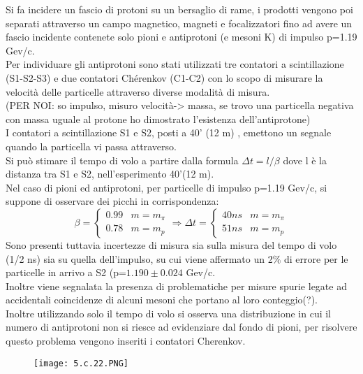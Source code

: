 \documentclass[twoside]{article}
\begin{document}
Si fa incidere un fascio di protoni su un bersaglio di rame, i prodotti vengono poi separati attraverso un campo magnetico, magneti e focalizzatori fino ad avere un fascio incidente contenete solo pioni e antiprotoni (e mesoni K) di impulso p=1.19 Gev/c.\\
Per individuare gli antiprotoni sono stati utilizzati tre contatori a scintillazione (S1-S2-S3) e due contatori Chérenkov (C1-C2) con lo scopo di misurare la velocità delle particelle attraverso diverse modalità di misura.\\
(PER NOI: so impulso, misuro velocità-> massa, se trovo una particella negativa con massa uguale al protone ho dimostrato l'esistenza dell'antiprotone)\\
I contatori a scintillazione S1 e S2, posti a 40' (12 m) , emettono un segnale quando la particella vi passa attraverso.\\
Si può stimare il tempo di volo a partire dalla formula $\Delta t= l/\beta$ dove l è la distanza tra S1 e S2, nell'esperimento 40'(12 m).\\
Nel caso di pioni ed antiprotoni, per particelle di impulso p=1.19 Gev/c, si suppone di osservare dei picchi in corrispondenza:\\
\begin{equation}
    \beta=\begin{cases}
    0.99 &  m=m_{\pi} \\
    0.78 &  m=m_{p}
    \end{cases}\Longrightarrow
    \Delta t=  \begin{cases}
    40 ns &  m=m_{\pi} \\
    51 ns &  m=m_{p}
    \end{cases}
\end{equation}
Sono presenti tuttavia incertezze di misura sia sulla misura del tempo di volo (1/2 ns) sia su quella dell'impulso, su cui viene affermato un 2$\%$ di errore per le particelle in arrivo a S2 (p=$1.190 \pm 0.024$ Gev/c.\\
Inoltre viene segnalata la presenza di problematiche per misure spurie legate ad accidentali coincidenze di alcuni mesoni che portano al loro conteggio(?).\\
Inoltre utilizzando solo il tempo di volo si osserva una distribuzione in cui il numero di antiprotoni non si riesce ad evidenziare dal fondo di pioni, per risolvere questo problema vengono inseriti i contatori Cherenkov.\\
\begin{figure}[H]
    \centering
    \texttt{[image: 5.c.22.PNG]}
    \label{fig:5.c.22}
\end{figure}
\end{document}
